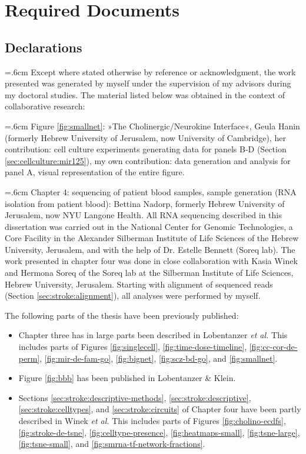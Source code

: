 \chapter{Required Documents} 
\label{appendix:req-doc}

\section{Declarations}
\noindent \hangindent=.6cm Except where stated otherwise by reference or acknowledgment, the work presented was generated by myself under the supervision of my advisors during my doctoral studies. The material listed below was obtained in the context of collaborative research:

\noindent \hangindent=.6cm Figure \ref{fig:smallnet}: »The Cholinergic/Neurokine Interface«, Geula Hanin (formerly Hebrew University of Jerusalem, now University of Cambridge), her contribution: cell culture experiments generating data for panels B-D (Section \ref{sec:cellculture:mir125}), my own contribution: data generation and analysis for panel A, visual representation of the entire figure.

\noindent \hangindent=.6cm Chapter 4: sequencing of patient blood samples, sample generation (RNA isolation from patient blood): Bettina Nadorp, formerly Hebrew University of Jerusalem, now NYU Langone Health. All RNA sequencing described in this dissertation was carried out in the National Center for Genomic Technologies, a Core Facility in the Alexander Silberman Institute of Life Sciences of the Hebrew University, Jerusalem, and with the help of Dr. Estelle Bennett (Soreq lab). The work presented in chapter four was done in close collaboration with Kasia Winek and Hermona Soreq of the Soreq lab at the Silberman Institute of Life Sciences, Hebrew University, Jerusalem. Starting with alignment of sequenced reads (Section \ref{sec:stroke:alignment}), all analyses were performed by myself.

\noindent The following parts of the thesis have been previously published:
\begin{itemize}[noitemsep, leftmargin=.5cm, label={\tiny\raisebox{.5ex}{\textbullet}}, topsep = 0pt]
\item Chapter three has in large parts been described in Lobentanzer \emph{et al.}\cite{Lobentanzer2019a} This includes parts of Figures \ref{fig:singlecell}, \ref{fig:time-dose-timeline}, \ref{fig:cc-cor-de-perm}, \ref{fig:mir-de-fam-go}, \ref{fig:bignet}, \ref{fig:scz-bd-go}, and \ref{fig:smallnet}.
\item Figure \ref{fig:bbb} has been published in Lobentanzer \& Klein.\cite{Lobentanzer2019b}
\item Sections \ref{sec:stroke:descriptive-methods}, \ref{sec:stroke:descriptive}, \ref{sec:stroke:celltypes}, and \ref{sec:stroke:circuits} of Chapter four have been partly described in Winek \emph{et al.}\cite{Winek2020} This includes parts of Figures \ref{fig:cholino-ecdfs}, \ref{fig:stroke-de-tsne}, \ref{fig:celltype-presence}, \ref{fig:heatmaps-small}, \ref{fig:tsne-large}, \ref{fig:tsne-small}, and \ref{fig:smrna-tf-network-fractions}.
\end{itemize}

